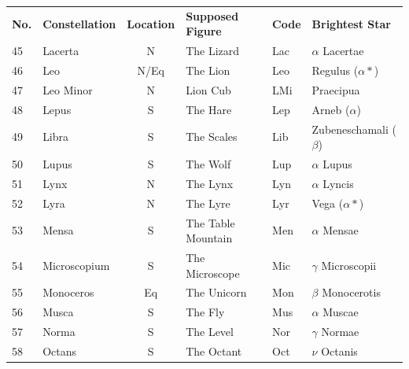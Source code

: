 \documentclass[a4paper,12pt]{extarticle}
\begin{document}
\begin{table}[H]
\begin{tabular}{llclll}
\rowcolor[HTML]{EFEFEF} 
{\color[HTML]{000000} \textbf{No.}} & {\color[HTML]{000000} \textbf{Constellation}} & {\color[HTML]{000000} \textbf{Location}} & {\color[HTML]{000000} \textbf{Supposed Figure}} & {\color[HTML]{000000} \textbf{Code}} & {\color[HTML]{000000} \textbf{Brightest Star}} \\
45 & Lacerta         & N    & The Lizard             & Lac & $\alpha$ Lacertae                  \\
46 & Leo             & N/Eq & The Lion               & Leo & Regulus ($\alpha \ast$)            \\
47 & Leo Minor       & N    & Lion Cub               & LMi & Praecipua  \\
48 & Lepus           & S    & The Hare               & Lep & Arneb ($\alpha$)                   \\
49 & Libra           & S    & The Scales             & Lib & Zubeneschamali ($\beta$)           \\
50 & Lupus           & S    & The Wolf               & Lup & $\alpha$ Lupus                     \\
51 & Lynx            & N    & The Lynx               & Lyn & $\alpha$ Lyncis                    \\
52 & Lyra            & N    & The Lyre               & Lyr & Vega ($\alpha \ast$)               \\
53 & Mensa           & S    & The Table Mountain     & Men & $\alpha$ Mensae                    \\
54 & Microscopium    & S    & The Microscope         & Mic & $\gamma$ Microscopii       \\
55                         & Monoceros                            & Eq                              & The Unicorn                            & Mon                         & $\beta$ Monocerotis                   \\
56                         & Musca                                & S                               & The Fly                                & Mus                         & $\alpha$ Muscae                       \\
57                         & Norma                                & S                               & The Level                              & Nor                         & $\gamma$ Normae                       \\
58                         & Octans                               & S                               & The Octant                             & Oct                         & $\nu$ Octanis                         \\

\end{tabular}
\end{table}
\end{document}
